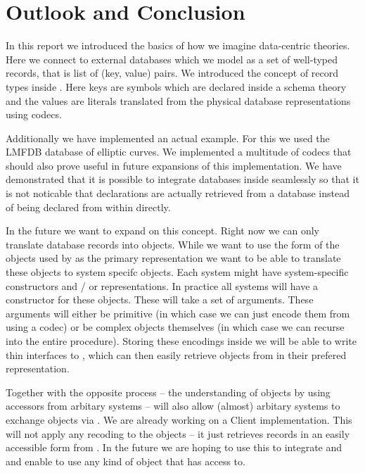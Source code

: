 \section{Outlook and Conclusion}\label{sec:conclusion}

In this report we introduced the basics of how we imagine \MMT data-centric theories. Here
we connect to external databases which we model as a set of well-typed records, that is
list of (key, value) pairs. We introduced the concept of record types inside \MMT. Here
keys are symbols which are declared inside a schema theory and the values are \MMT
literals translated from the physical database representations using codecs.

Additionally we have implemented an actual example. For this we used the LMFDB database of
elliptic curves. We implemented a multitude of codecs that should also prove useful in
future expansions of this implementation. We have demonstrated that it is possible to
integrate databases inside \MMT seamlessly so that it is not noticable that declarations
are actually retrieved from a database instead of being declared from within \MMT
directly.

In the future we want to expand on this concept. Right now we can only translate database
records into \MMT objects. While we want to use the form of the objects used by \MMT as
the primary representation we want to be able to translate these objects to system specifc
objects. Each system might have system-specific constructors and / or representations. In
practice all systems will have a constructor for these objects. These will take a set of
arguments. These arguments will either be primitive (in which case we can just encode them
from \MMT using a codec) or be complex objects themselves (in which case we can recurse
into the entire procedure). Storing these encodings inside \MMT we will be able to write
thin interfaces to \MMT, which can then easily retrieve objects from \MMT in their
prefered representation.

Together with the opposite process -- the understanding of objects by using accessors from
arbitary systems -- will also allow (almost) arbitary systems to exchange objects via
\MMT. We are already working on a \python Client implementation. This will not apply any
recoding to the objects -- it just retrieves records in an easily accessible form from
\MMT. In the future we are hoping to use this to integrate \MMT and \GAP and enable \GAP
to use any kind of object that \MMT has access to.

